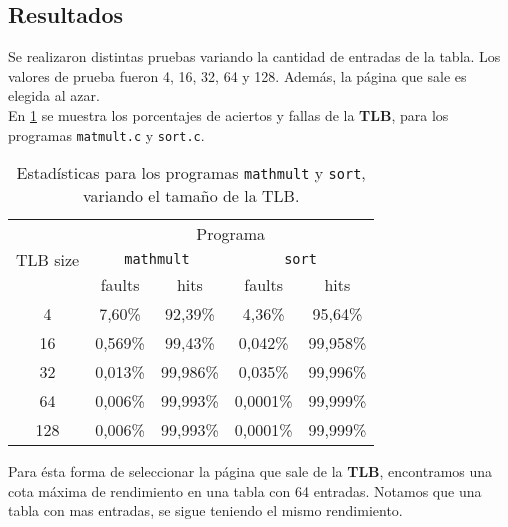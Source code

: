 \subsection*{Resultados}
Se realizaron distintas pruebas variando la cantidad de entradas de la tabla. Los valores de prueba fueron 4, 16, 32, 64 y 128. Además, la página que sale es elegida al azar.\\
En \ref{tab:practica04:statics} se muestra los porcentajes de aciertos y fallas de la \textbf{TLB}, para los programas \texttt{matmult.c} y \texttt{sort.c}.\\ 
\begin{table}
	\center
	\begin{tabular}{|c|c|c|c|c|}
	    \hline
		\multirow{3}{*}{TLB size}   &    \multicolumn{4}{c|}{Programa}           \\
		\cline{2-5}
            &            \multicolumn{2}{c|}{\texttt{mathmult}}    &    \multicolumn{2}{c|}{\texttt{sort}} \\
        \cline{2-5}
            &    faults    &    hits       &    faults    &    hits    \\
		\hline
		4   &    7,60\%    &    92,39\%    &    4,36\%    &    95,64\% \\
       16   &    0,569\%   &    99,43\%    &    0,042\%   &    99,958\%   \\
       32   &    0,013\%   &    99,986\%   &    0,035\%   &    99,996\%    \\               
       64   &    0,006\%   &    99,993\%   &    0,0001\%  &    99,999\%    \\               
      128   &    0,006\%   &    99,993\%   &    0,0001\%  &    99,999\%    \\    \hline             
	\end{tabular}
    \caption{Estadísticas para los programas \texttt{mathmult} y \texttt{sort}, variando el tamaño de la TLB.}
	\label{tab:practica04:statics}
\end{table}
Para ésta forma de seleccionar la página  que sale de la \textbf{TLB}, encontramos una cota máxima de rendimiento en una tabla con 64 entradas. Notamos que una tabla con mas entradas, se sigue teniendo el mismo rendimiento.
\newpage
